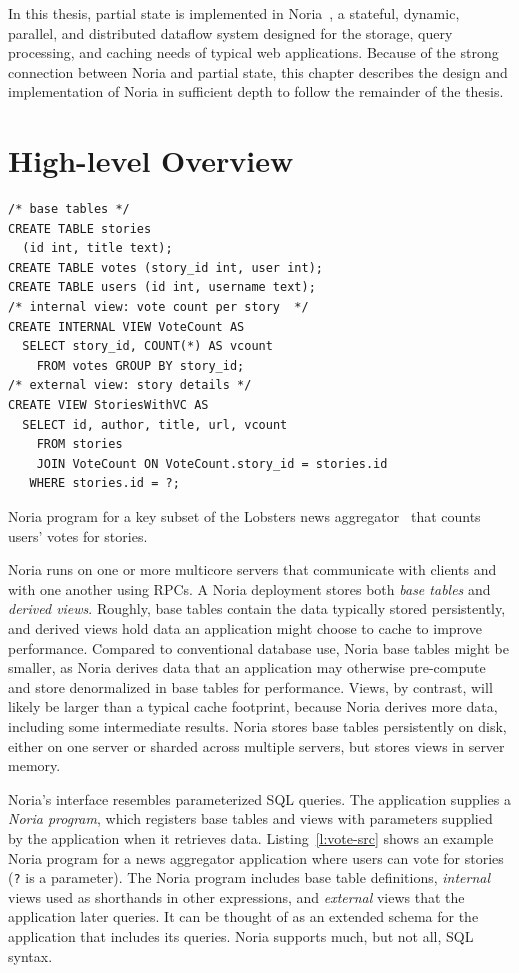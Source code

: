 In this thesis, partial state is implemented in Noria~\cite{noria}, a stateful,
dynamic, parallel, and distributed dataflow system designed for the storage,
query processing, and caching needs of typical web applications. Because of the
strong connection between Noria and partial state, this chapter describes the
design and implementation of Noria in sufficient depth to follow the remainder
of the thesis.

\section{High-level Overview}

\begin{listing}[h]
  \begin{verbatim}
/* base tables */
CREATE TABLE stories
  (id int, title text);
CREATE TABLE votes (story_id int, user int);
CREATE TABLE users (id int, username text);
/* internal view: vote count per story  */
CREATE INTERNAL VIEW VoteCount AS
  SELECT story_id, COUNT(*) AS vcount
    FROM votes GROUP BY story_id;
/* external view: story details */
CREATE VIEW StoriesWithVC AS
  SELECT id, author, title, url, vcount
    FROM stories
    JOIN VoteCount ON VoteCount.story_id = stories.id
   WHERE stories.id = ?;
  \end{verbatim}
  \caption{Noria program for a key subset of the Lobsters news
           aggregator~\cite{lobsters} that counts users' votes for stories.}
  \label{l:vote-src}
\end{listing}

Noria runs on one or more multicore servers that communicate with clients and
with one another using RPCs. A Noria deployment stores both \emph{base tables}
and \emph{derived views}. Roughly, base tables contain the data typically stored
persistently, and derived views hold data an application might choose to cache
to improve performance. Compared to conventional database use, Noria base tables
might be smaller, as Noria derives data that an application may otherwise
pre-compute and store denormalized in base tables for performance. Views, by
contrast, will likely be larger than a typical cache footprint, because Noria
derives more data, including some intermediate results. Noria stores base tables
persistently on disk, either on one server or sharded across multiple servers,
but stores views in server memory.

Noria's interface resembles parameterized SQL queries. The application supplies
a \emph{Noria program}, which registers base tables and views with parameters
supplied by the application when it retrieves data. Listing~\vref{l:vote-src}
shows an example Noria program for a news aggregator application where users can
vote for stories (\texttt{?} is a parameter). The Noria program includes base
table definitions, \emph{internal} views used as shorthands in other
expressions, and \emph{external} views that the application later queries. It
can be thought of as an extended schema for the application that includes its
queries. Noria supports much, but not all, SQL syntax.

